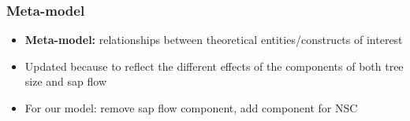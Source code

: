 \documentclass[usepdftitle=false]{beamer}
\newenvironment{changemargin}[2]{%
	\begin{list}{}{%
			\setlength{\topsep}{0pt}%
			\setlength{\leftmargin}{#1}%
			\setlength{\rightmargin}{#2}%
			\setlength{\listparindent}{\parindent}%
			\setlength{\itemindent}{\parindent}%
			\setlength{\parsep}{\parskip}%
		}%
		\item[]}
	{\end{list}
}
\begin{document}
\begin{frame}
	\frametitle{Meta-model}
	\begin{changemargin}{-2em}{-2em}
		\centering
		\begin{itemize}
			\item<alert@1> \textbf{Meta-model:} relationships between theoretical entities/constructs of interest
			\item<2-| alert@2> Updated because to reflect the different effects of the components of both tree size and sap flow
			\item<visible@3| alert@3> For our model: remove sap flow component, add component for NSC
		\end{itemize}
	\end{changemargin}
\end{frame}
\end{document}

